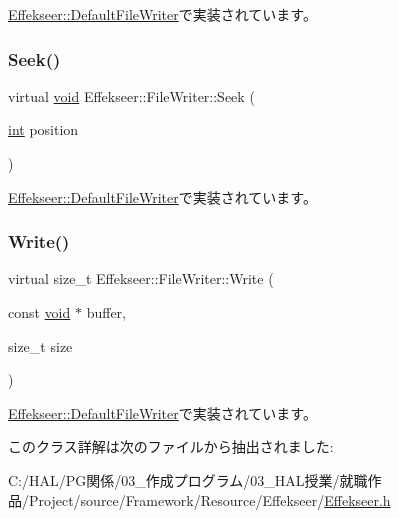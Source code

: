 \mbox{\hyperlink{class_effekseer_1_1_default_file_writer_aa85409b51ae30ea259ce2d0f0bd30656}{Effekseer\+::\+Default\+File\+Writer}}で実装されています。

\mbox{\label{class_effekseer_1_1_file_writer_a9057c57df33d5112bc0d2c4e3e0c542d}} 
\subsubsection{\texorpdfstring{Seek()}{Seek()}}
{\footnotesize\ttfamily virtual \mbox{\hyperlink{namespace_effekseer_ab34c4088e512200cf4c2716f168deb56}{void}} Effekseer\+::\+File\+Writer\+::\+Seek (\begin{DoxyParamCaption}\item[{\mbox{\hyperlink{namespace_effekseer_ace0abf7c2e6947e519ebe8b54cbcc30a}{int}}}]{position }\end{DoxyParamCaption})\hspace{0.3cm}{\ttfamily [pure virtual]}}



\mbox{\hyperlink{class_effekseer_1_1_default_file_writer_a2329533000c58267e8e2457f3480bf73}{Effekseer\+::\+Default\+File\+Writer}}で実装されています。

\mbox{\label{class_effekseer_1_1_file_writer_a7bdd5dc4f70f8e83c03de7e96af5dc27}} 
\subsubsection{\texorpdfstring{Write()}{Write()}}
{\footnotesize\ttfamily virtual size\+\_\+t Effekseer\+::\+File\+Writer\+::\+Write (\begin{DoxyParamCaption}\item[{const \mbox{\hyperlink{namespace_effekseer_ab34c4088e512200cf4c2716f168deb56}{void}} $\ast$}]{buffer,  }\item[{size\+\_\+t}]{size }\end{DoxyParamCaption})\hspace{0.3cm}{\ttfamily [pure virtual]}}



\mbox{\hyperlink{class_effekseer_1_1_default_file_writer_afceaff03cd45477058ffdc1370d06884}{Effekseer\+::\+Default\+File\+Writer}}で実装されています。



このクラス詳解は次のファイルから抽出されました\+:\begin{DoxyCompactItemize}
\item 
C\+:/\+H\+A\+L/\+P\+G関係/03\+\_\+作成プログラム/03\+\_\+\+H\+A\+L授業/就職作品/\+Project/source/\+Framework/\+Resource/\+Effekseer/\mbox{\hyperlink{_effekseer_8h}{Effekseer.\+h}}\end{DoxyCompactItemize}
